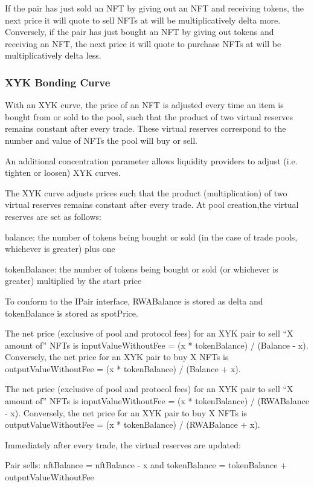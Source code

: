 \documentclass[11pt]{article}
\begin{document}
If the pair has just sold an NFT by giving out an NFT and receiving tokens, the next price it will quote to sell NFTs at will be multiplicatively delta more. Conversely, if the pair has just bought an NFT by giving out tokens and receiving an NFT, the next price it will quote to purchase NFTs at will be multiplicatively delta less.


\subsubsection{XYK Bonding Curve}

With an XYK curve, the price of an NFT is adjusted every time an item is bought from or sold to the pool, such that the product of two virtual reserves remains constant after every trade. These virtual reserves correspond to the number and value of NFTs the pool will buy or sell.


An additional concentration parameter allows liquidity providers to adjust (i.e. tighten or loosen) XYK curves.


The XYK curve adjusts prices such that the product (multiplication) of two virtual reserves remains constant after every trade. At pool creation,the virtual reserves are set as follows:


balance: the number of tokens being bought or sold (in the case of trade pools, whichever is greater) plus one


tokenBalance: the number of tokens being bought or sold (or whichever is greater) multiplied by the start price


To conform to the IPair interface, RWABalance is stored as delta and tokenBalance is stored as spotPrice.


The net price (exclusive of pool and protocol fees) for an XYK pair to sell ``X amount of'' NFTs is inputValueWithoutFee = (x * tokenBalance) / (Balance - x). Conversely, the net price for an XYK pair to buy X NFTs is outputValueWithoutFee = (x * tokenBalance) / (Balance + x).


The net price (exclusive of pool and protocol fees) for an XYK pair to sell ``X amount of'' NFTs is inputValueWithoutFee = (x * tokenBalance) / (RWABalance - x). Conversely, the net price for an XYK pair to buy X NFTs is outputValueWithoutFee = (x * tokenBalance) / (RWABalance + x).


Immediately after every trade, the virtual reserves are updated:


Pair sells: nftBalance = nftBalance - x and tokenBalance = tokenBalance + outputValueWithoutFee
\end{document}
